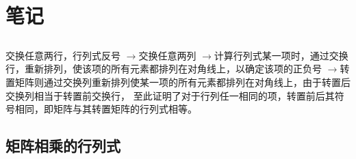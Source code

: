 \section{笔记}

\subsection{}
交换任意两行，行列式反号
$\rightarrow$交换任意两列
$\rightarrow$计算行列式某一项时，通过交换行，重新排列，使该项的所有元素都排列在对角线上，以确定该项的正负号
$\rightarrow$转置矩阵则通过交换列重新排列使某一项的所有元素都排列在对角线上，由于转置后交换列相当于转置前交换行，
至此证明了对于行列任一相同的项，转置前后其符号相同，即矩阵与其转置矩阵的行列式相等。

\subsection{矩阵相乘的行列式}

